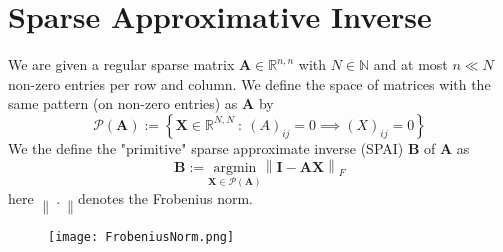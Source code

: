 \documentclass{article}
\begin{document}
\section*{Sparse Approximative Inverse}
We are given a regular sparse matrix $\mathbf{A}\in \mathbb{R}^{n,n}$ with $N \in \mathbb{N}$ and at most $n \ll N$ non-zero entries per row and column. We define the space of matrices with the same pattern (on non-zero entries) as $\mathbf{A}$ by
\begin{equation*}
    \mathcal{P}\left(\mathbf{A}\right) := \left\{\mathbf{X} \in \mathbb{R}^{N,N} \: : \: \left(A\right)_{ij} = 0 \implies \left(X\right)_{ij} = 0\right\}
\end{equation*}
We the define the "primitive" sparse approximate inverse (SPAI) $\mathbf{B}$ of $\mathbf{A}$ as
\begin{equation}
    \mathbf{B} := \underset{\mathbf{X}\in \mathcal{P}\left(\mathbf{A}\right)}{\text{argmin}}\left\lVert \mathbf{I}-\mathbf{A}\mathbf{X}\right\rVert_{F}
\end{equation}
here $\left\lVert\:.\:\right\rVert$denotes the Frobenius norm.

\begin{figure}[!hbt]
    \centering
\texttt{[image: FrobeniusNorm.png]}
\end{figure}
\end{document}
